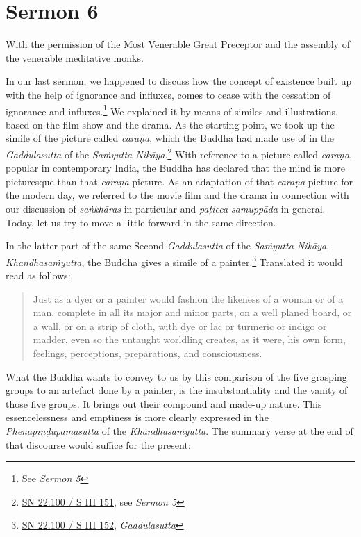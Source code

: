 \chapter{Sermon 6}

\NibbanaOpeningQuote

With the permission of the Most Venerable Great Preceptor and the assembly of the venerable meditative monks.

In our last sermon, we happened to discuss how the concept of existence built up with the help of ignorance and influxes, comes to cease with the cessation of ignorance and influxes.\footnote{See \emph{Sermon 5}} We explained it by means of similes and illustrations, based on the film show and the drama. As the starting point, we took up the simile of the picture called \emph{caraṇa}, which the Buddha had made use of in the \emph{Gaddulasutta} of the \emph{Saṁyutta Nikāya}.\footnote{\href{https://suttacentral.net/sn22.100/pli/ms}{SN 22.100 / S III 151}, see \emph{Sermon 5}} With reference to a picture called \emph{caraṇa}, popular in contemporary India, the Buddha has declared that the mind is more picturesque than that \emph{caraṇa} picture. As an adaptation of that \emph{caraṇa} picture for the modern day, we referred to the movie film and the drama in connection with our discussion of \emph{saṅkhāras} in particular and \emph{paṭicca samuppāda} in general. Today, let us try to move a little forward in the same direction.

In the latter part of the same Second \emph{Gaddulasutta} of the \emph{Saṁyutta Nikāya}, \emph{Khandhasaṁyutta}, the Buddha gives a simile of a painter.\footnote{\href{https://suttacentral.net/sn22.100/pli/ms}{SN 22.100 / S III 152}, \emph{Gaddulasutta}} Translated it would read as follows:

\begin{quote}
Just as a dyer or a painter would fashion the likeness of a woman or of a man, complete in all its major and minor parts, on a well planed board, or a wall, or on a strip of cloth, with dye or lac or turmeric or indigo or madder, even so the untaught worldling creates, as it were, his own form, feelings, perceptions, preparations, and consciousness.
\end{quote}

What the Buddha wants to convey to us by this comparison of the five grasping groups to an artefact done by a painter, is the insubstantiality and the vanity of those five groups. It brings out their compound and made-up nature. This essencelessness and emptiness is more clearly expressed in the \emph{Pheṇapiṇḍūpamasutta} of the \emph{Khandhasaṁyutta}. The summary verse at the end of that discourse would suffice for the present:


